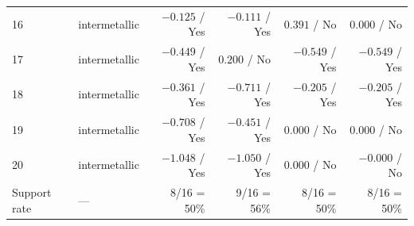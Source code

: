 \documentclass[%
 preprint,
 superscriptaddress,
 amsmath,amssymb,
 aps,
 prb,
 floatfix,
]{revtex4-2}
\begin{document}
\begin{table}[t]
\begin{tabular}{llrrrr}
16 & intermetallic & $-0.125$ / Yes & $-0.111$ / Yes & $0.391$ / No & $0.000$ / No \\
17 & intermetallic & $-0.449$ / Yes & $0.200$ / No & $-0.549$ / Yes & $-0.549$ / Yes \\
18 & intermetallic & $-0.361$ / Yes & $-0.711$ / Yes & $-0.205$ / Yes & $-0.205$ / Yes \\
19 & intermetallic & $-0.708$ / Yes & $-0.451$ / Yes & $0.000$ / No & $0.000$ / No \\
20 & intermetallic & $-1.048$ / Yes & $-1.050$ / Yes & $0.000$ / No & $-0.000$ / No \\
\midrule
Support rate & --- & 8/16 = 50\% & 9/16 = 56\% & 8/16 = 50\% & 8/16 = 50\% \\
\bottomrule
\end{tabular}
\end{table}
\end{document}
